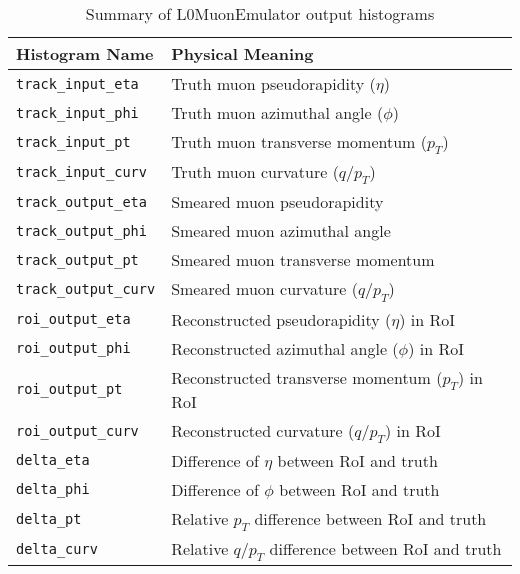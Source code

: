 \begin{table}[htbp]
  \centering
  \caption{Summary of L0MuonEmulator output histograms}
  \label{tab:L0MuonPlots}
  \begin{tabular}{ll}
    \hline
    Histogram Name & Physical Meaning \\
    \hline
    \texttt{track\_input\_eta}     & Truth muon pseudorapidity ($\eta$) \\
    \texttt{track\_input\_phi}     & Truth muon azimuthal angle ($\phi$) \\
    \texttt{track\_input\_pt}      & Truth muon transverse momentum ($p_T$) \\
    \texttt{track\_input\_curv}    & Truth muon curvature ($q/p_T$) \\
    \texttt{track\_output\_eta}    & Smeared muon pseudorapidity \\
    \texttt{track\_output\_phi}    & Smeared muon azimuthal angle \\
    \texttt{track\_output\_pt}     & Smeared muon transverse momentum \\
    \texttt{track\_output\_curv}   & Smeared muon curvature ($q/p_T$) \\
    \texttt{roi\_output\_eta}      & Reconstructed pseudorapidity ($\eta$) in RoI  \\
    \texttt{roi\_output\_phi}      & Reconstructed azimuthal angle ($\phi$) in RoI  \\
    \texttt{roi\_output\_pt}       & Reconstructed transverse momentum ($p_T$) in RoI \\
    \texttt{roi\_output\_curv}     & Reconstructed curvature ($q/p_T$) in RoI\\
    \texttt{delta\_eta}            & Difference of $\eta$ between RoI and truth \\
    \texttt{delta\_phi}            & Difference of $\phi$ between RoI and truth\\
    \texttt{delta\_pt}             & Relative $p_T$ difference between RoI and truth \\
    \texttt{delta\_curv}           & Relative $q/p_T$ difference between RoI and truth \\
    \hline
  \end{tabular}
\end{table}